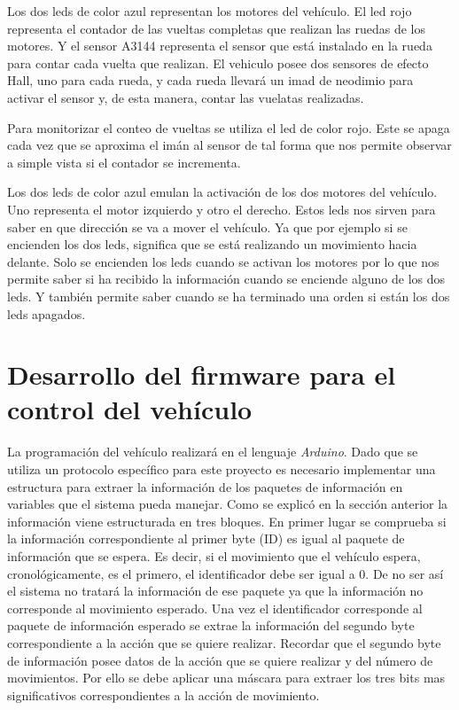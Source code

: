 Los dos leds de color azul representan los motores del vehículo. El led rojo representa el contador de las vueltas completas que realizan las ruedas de los motores. Y el sensor A3144 representa el sensor que está instalado en la rueda para contar cada vuelta que realizan. El vehiculo posee dos sensores de efecto Hall, uno para cada rueda, y cada rueda llevará un imad de neodimio para activar el sensor y, de esta manera, contar las vuelatas realizadas.


Para monitorizar el conteo de vueltas se utiliza el led de color rojo. Este se apaga cada vez que se aproxima el imán al sensor de tal forma que nos permite observar a simple vista si el contador se incrementa.

Los dos leds de color azul emulan la activación de los dos motores del vehículo. Uno representa el motor izquierdo y otro el derecho. Estos leds nos sirven para saber en que dirección se va a mover el vehículo. Ya que por ejemplo si se encienden los dos leds, significa que se está realizando un movimiento hacia delante. Solo se encienden los leds cuando se activan los motores por lo que nos permite saber si ha recibido la información cuando se enciende alguno de los dos leds. Y también permite saber cuando se ha terminado una orden si están los dos leds apagados.

 \section{Desarrollo del firmware para el control del vehículo}\label{sec:ConfiguracionCoche}
La programación del vehículo realizará en el lenguaje \emph{Arduino}. Dado que se utiliza un protocolo específico para este proyecto es necesario implementar una estructura para extraer la información de los paquetes de información en variables que el sistema pueda manejar. Como se explicó en la sección anterior la información viene estructurada en tres bloques. En primer lugar se comprueba si la información correspondiente al primer byte (ID) es igual al paquete de información que se espera. Es decir, si el movimiento que el vehículo espera, cronológicamente, es el primero, el identificador debe ser igual a 0. De no ser así el sistema no tratará la información de ese paquete ya que la información no corresponde al movimiento esperado. Una vez el identificador corresponde al paquete de información esperado se extrae la información del segundo byte correspondiente a la acción que se quiere realizar. Recordar que el segundo byte de información posee datos de la acción que se quiere realizar y del número de movimientos. Por ello se debe aplicar una máscara para extraer los tres bits mas significativos correspondientes a la acción de  movimiento. 


